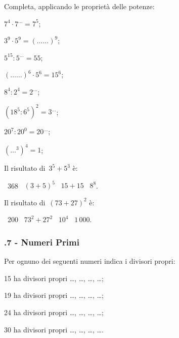\pagebreak
\begin{esercizio}
\label{ese:1.12}
 Completa, applicando le proprietà delle potenze:
\begin{multicols}{3}
 \begin{enumeratea}
 \item $7^4\cdot7^{\ldots}=7^5$;
 \item $3^9\cdot5^9=(\ldots\ldots)^9$;
 \item $5^{15}:5^{\ldots}=55$;
 \item $(\ldots\ldots)^6\cdot5^6=15^6$;
 \item $8^4:2^4=2^{\ldots}$;
 \item $\left(18^5:6^5\right)^2=3^{\ldots}$;
 \item $20^7:20^0=20^{\ldots}$;
 \item $\left(\ldots^3\right)^4=1$;
 \end{enumeratea}
\end{multicols}
\end{esercizio}

\begin{esercizio}
\label{ese:1.13}
 Il risultato di~$3^5+5^3$ è:
 \begin{center}
 \boxA\:~368 \quad\boxB\:~$(3+5)^5$ \quad\boxC\:~$15+15$ \quad\boxD\:~$8^8$.
 \end{center}
\end{esercizio}

\begin{esercizio}
\label{ese:1.14}
 Il risultato di~$(73+27)^2$ è:
 \begin{center}
 \boxA\:~200 \quad\boxB\:~$73^2+27^2$ \quad\boxC\:~$10^4$ \quad\boxD\:~$1\,000$.
 \end{center}
\end{esercizio}

\subsubsection*{\thechapter.7 - Numeri Primi}
\begin{esercizio}
\label{ese:1.15}
 Per ognuno dei seguenti numeri indica i divisori propri:
 \begin{enumeratea}
 \item 15 ha divisori propri \ldots, \ldots, \ldots, \ldots;
 \item 19 ha divisori propri \ldots, \ldots, \ldots, \ldots;
 \item 24 ha divisori propri \ldots, \ldots, \ldots, \ldots;
 \item 30 ha divisori propri \ldots, \ldots, \ldots, \ldots.
 \end{enumeratea}
\end{esercizio}

